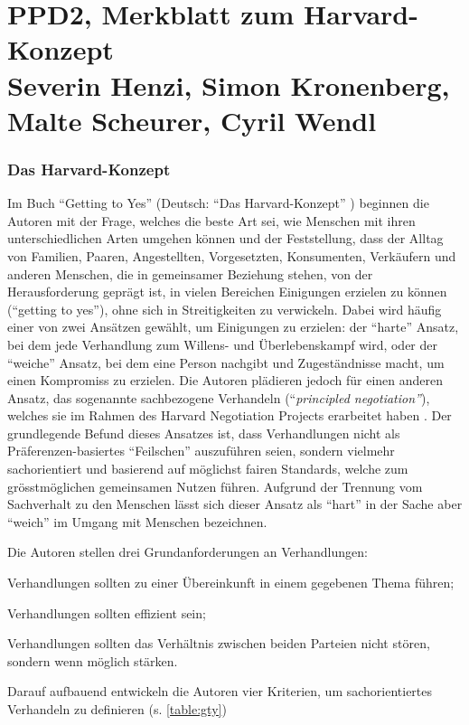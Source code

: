\part*{PPD2, Merkblatt zum Harvard-Konzept\\\normalsize
Severin Henzi, Simon Kronenberg, Malte Scheurer, Cyril Wendl}

\section*{Das Harvard-Konzept}
Im Buch ``Getting to Yes'' (Deutsch: ``Das Harvard-Konzept'' \cite{harvardKonzeptDE}) beginnen die Autoren \textcite{Fisher1981GettingTY} mit der Frage, welches die beste Art sei, wie Menschen mit ihren unterschiedlichen Arten umgehen können und der Feststellung, dass der Alltag von Familien, Paaren, Angestellten, Vorgesetzten, Konsumenten, Verkäufern und anderen Menschen, die in gemeinsamer Beziehung stehen, von der Herausforderung geprägt ist, in vielen Bereichen Einigungen erzielen zu können (``getting to yes''), ohne sich in Streitigkeiten zu verwickeln. Dabei wird häufig einer von zwei Ansätzen gewählt, um Einigungen zu erzielen: der ``harte'' Ansatz, bei dem jede Verhandlung zum Willens- und Überlebenskampf wird, oder der ``weiche'' Ansatz, bei dem eine Person nachgibt und Zugeständnisse macht, um einen Kompromiss zu erzielen. Die Autoren plädieren jedoch für einen anderen Ansatz, das sogenannte sachbezogene Verhandeln (``\textit{principled negotiation''}), welches sie im Rahmen des Harvard Negotiation Projects erarbeitet haben \cite{hnp}. Der grundlegende Befund dieses Ansatzes ist, dass Verhandlungen nicht als Präferenzen-basiertes ``Feilschen'' auszuführen seien, sondern vielmehr sachorientiert und basierend auf möglichst fairen Standards, welche zum grösstmöglichen gemeinsamen Nutzen führen. Aufgrund der Trennung vom Sachverhalt zu den Menschen lässt sich dieser Ansatz als ``hart'' in der Sache aber ``weich'' im Umgang mit Menschen bezeichnen. 

Die Autoren stellen drei Grundanforderungen an Verhandlungen: 
\begin{enumerate*}
\item Verhandlungen sollten zu einer Übereinkunft in einem gegebenen Thema führen;
\item Verhandlungen sollten effizient sein;
\item Verhandlungen sollten das Verhältnis zwischen beiden Parteien nicht stören, sondern wenn möglich stärken.
\end{enumerate*} Darauf aufbauend entwickeln die Autoren vier Kriterien, um sachorientiertes Verhandeln zu definieren (s. \cref{table:gty})

